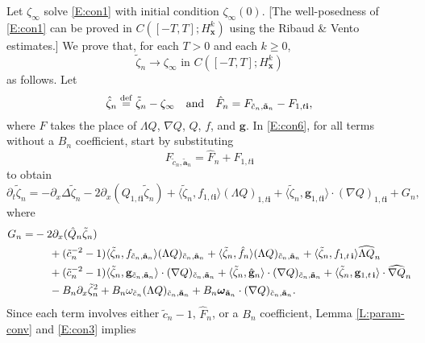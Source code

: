 \documentclass[12pt,letterpaper]{amsart}
\newcommand{\la}{\langle}
\newcommand{\ra}{\rangle}
\newcommand{\defeq}{\stackrel{\rm{def}}{=}}
\theoremstyle{remark}
\numberwithin{equation}{section}
\numberwithin{theorem}{section}
\numberwithin{table}{section}
\begin{document}
Let $\zeta_\infty$ solve \eqref{E:con1} with initial condition $\zeta_\infty(0)$. [The well-posedness of \eqref{E:con1} can be proved in $C([-T,T];H_{\mathbf{x}}^k)$ using the Ribaud \& Vento estimates.]  We prove that, for each $T>0$ and each $k\geq 0$, 
\begin{equation}
\label{E:con8}
\tilde{\zeta}_n \to \zeta_\infty \text{ in } C([-T,T]; H_{\mathbf{x}}^k)
\end{equation}
as follows.  Let 
$$
\hat \zeta_n \defeq \tilde{\zeta}_n -  \zeta_\infty \quad \mbox{and} \quad \hat F_n = F_{\tilde{c}_n, \tilde{\mathbf{a}}_n} - F_{1,t\mathbf{i}},
$$
where $F$ takes the place of $\Lambda Q$, $\nabla Q$, $Q$, $f$, and $\mathbf{g}$.  In \eqref{E:con6}, for all terms without a $B_n$ coefficient, start by substituting 
$$F_{\tilde{c}_n, \tilde{\mathbf{a}}_n} = \hat F_n + F_{1,t\mathbf{i}}$$
to obtain
\begin{equation}
\label{E:con20}
\partial_t \tilde \zeta_n = - \partial_x \Delta \tilde \zeta_n - 2 \partial_x ( Q_{1,t\mathbf{i}} \tilde \zeta_n) + \la \tilde \zeta_n, f_{1,t\mathbf{i}} \ra (\Lambda Q)_{1,t\mathbf{i}} +  \la \tilde \zeta_n, \mathbf{g}_{1,t\mathbf{i}} \ra \cdot (\nabla Q)_{1, t \mathbf{i}} + G_n,
\end{equation}
where 
\begin{align*}
G_n = &-2\partial_x ( \hat Q_n \tilde \zeta_n) \\
&\hspace{5mm} +( \tilde c_n^{-2}-1) \la \tilde \zeta_n, f_{\tilde c_n, \tilde{\mathbf{a}}_n} \ra (\Lambda Q)_{\tilde c_n, \tilde{\mathbf{a}}_n} + \la \tilde \zeta_n, \hat f_n \ra (\Lambda Q)_{\tilde c_n, \tilde{\mathbf{a}}_n} + \la \tilde \zeta_n, f_{1,t \,\mathbf{i}} \ra \widehat{\Lambda Q}_n \\
&\hspace{5mm} +( \tilde c_n^{-2}-1) \la \tilde \zeta_n, \mathbf{g}_{\tilde c_n, \tilde{\mathbf{a}}_n} \ra \cdot (\nabla Q)_{\tilde c_n, \tilde{\mathbf{a}}_n} + \la \tilde \zeta_n, \hat{\mathbf{g}}_n \ra \cdot (\nabla Q)_{\tilde c_n, \tilde{\mathbf{a}}_n} + \la \tilde \zeta_n, \mathbf{g}_{1,t\,\mathbf{i}} \ra \cdot \widehat{\nabla Q}_n  \\
&\hspace{5mm} - B_n \partial_x \tilde{\zeta}_n^2 + B_n \omega_{\tilde c_n} (\Lambda Q)_{\tilde c_n,\tilde{\mathbf{a}}_n}  + B_n\boldsymbol{\omega}_{\tilde{\mathbf{a}}_n} \cdot (\nabla Q)_{{\tilde c_n},\tilde{\mathbf{a}}_n}.
\end{align*}
Since each term involves either $\tilde c_n -1$, $\hat F_n$, or a $B_n$ coefficient, Lemma \ref{L:param-conv} and \eqref{E:con3} implies
\end{document}

